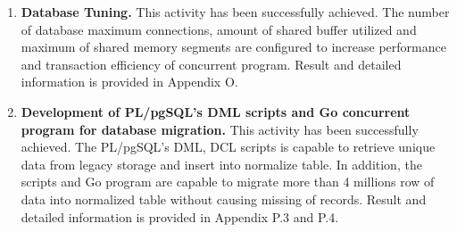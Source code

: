 \begin{enumerate}[topsep=0pt,itemsep=-1ex,partopsep=1ex,parsep=1.5ex]
	\item \textbf{Database Tuning.} This activity has been successfully achieved. The number of database maximum connections, amount of shared buffer utilized and maximum of shared memory segments are configured to increase performance and transaction efficiency of concurrent program. Result and detailed information is provided in Appendix O. 
	
	\item \textbf{Development of PL/pgSQL's DML scripts and Go concurrent program for database migration.} This activity has been successfully achieved. The PL/pgSQL's DML, DCL scripts is capable to retrieve unique data from legacy storage and insert into normalize table. In addition, the scripts and Go program are capable to migrate more than 4 millions row of data into normalized table without causing missing of records. Result and detailed information is provided in Appendix P.3 and P.4. 
	
\end{enumerate}

